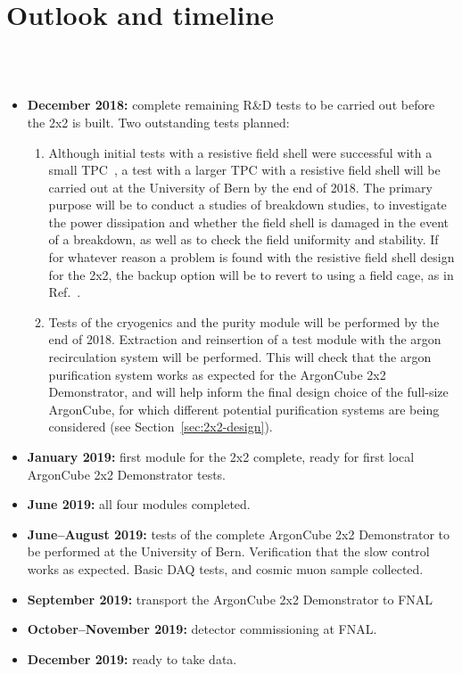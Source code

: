 \section{Outlook and timeline}
\label{sec:outlook}

\\
\\
\begin{itemize}
\item {\bf December 2018:} complete remaining R\&D tests to be carried out before the 2x2 is built. Two outstanding tests planned:
  \begin{enumerate}
  \item Although initial tests with a resistive field shell were successful with a small TPC~\addcite {}, a test with a larger TPC with a resistive field shell will be carried out at the University of Bern by the end of 2018. The primary purpose will be to conduct a studies of breakdown studies, to investigate the power dissipation and whether the field shell is damaged in the event of a breakdown, as well as to check the field uniformity and stability. If for whatever reason a problem is found with the resistive field shell design for the 2x2, the backup option will be to revert to using a field cage, as in Ref.~\cite{argoncube_loi}.
  \item Tests of the cryogenics and the purity module will be performed by the end of 2018. Extraction and reinsertion of a test module with the argon recirculation system will be performed. This will check that the argon purification system works as expected for the ArgonCube 2x2 Demonstrator, and will help inform the final design choice of the full-size ArgonCube, for which different potential purification systems are being considered (see Section~\ref{sec:2x2-design}).
  \end{enumerate}
\item {\bf January 2019:} first module for the 2x2 complete, ready for first local ArgonCube 2x2 Demonstrator tests.
\item {\bf June 2019:} all four modules completed.
\item {\bf June--August 2019:} tests of the complete ArgonCube 2x2 Demonstrator to be performed at the University of Bern. Verification that the slow control works as expected. Basic DAQ tests, and cosmic muon sample collected.
\item {\bf September 2019:} transport the ArgonCube 2x2 Demonstrator to FNAL
\item {\bf October--November 2019:} detector commissioning at FNAL.
\item {\bf December 2019:} ready to take data. 
\end{itemize}
